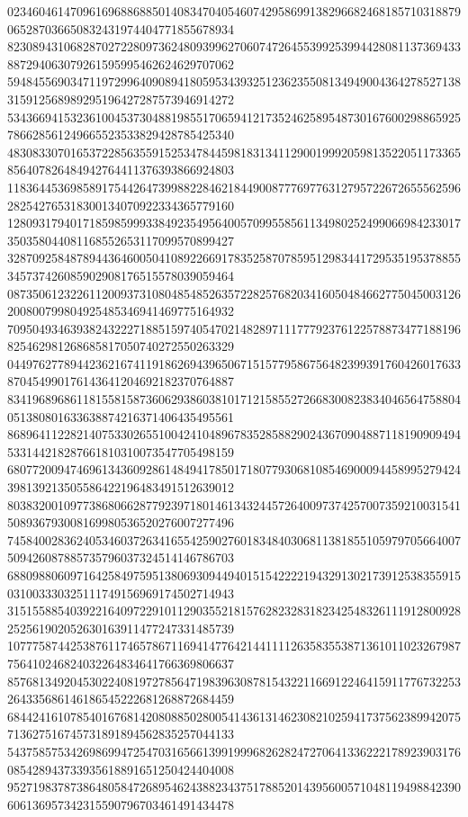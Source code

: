 \begin{DoxyCode}
      023460461470961696886885014083470405460742958699138296682468185710318879065287036650832431974404771855678934
      823089431068287027228097362480939962706074726455399253994428081137369433887294063079261595995462624629707062
      594845569034711972996409089418059534393251236235508134949004364278527138315912568989295196427287573946914272
      534366941532361004537304881985517065941217352462589548730167600298865925786628561249665523533829428785425340
      483083307016537228563559152534784459818313411290019992059813522051173365856407826484942764411376393866924803
      118364453698589175442647399882284621844900877769776312795722672655562596282542765318300134070922334365779160
      128093179401718598599933849235495640057099558561134980252499066984233017350358044081168552653117099570899427
      328709258487894436460050410892266917835258707859512983441729535195378855345737426085902908176515578039059464
      087350612322611200937310804854852635722825768203416050484662775045003126200800799804925485346941469775164932
      709504934639382432227188515974054702148289711177792376122578873477188196825462981268685817050740272550263329
      044976277894423621674119186269439650671515779586756482399391760426017633870454990176143641204692182370764887
      834196896861181558158736062938603810171215855272668300823834046564758804051380801633638874216371406435495561
      868964112282140753302655100424104896783528588290243670904887118190909494533144218287661810310073547705498159
      680772009474696134360928614849417850171807793068108546900094458995279424398139213505586422196483491512639012
      803832001097738680662877923971801461343244572640097374257007359210031541508936793008169980536520276007277496
      745840028362405346037263416554259027601834840306811381855105979705664007509426087885735796037324514146786703
      688098806097164258497595138069309449401515422221943291302173912538355915031003330325111749156969174502714943
      315155885403922164097229101129035521815762823283182342548326111912800928252561902052630163911477247331485739
      107775874425387611746578671169414776421441111263583553871361011023267987756410246824032264834641766369806637
      857681349204530224081972785647198396308781543221166912246415911776732253264335686146186545222681268872684459
      684424161078540167681420808850280054143613146230821025941737562389942075713627516745731891894562835257044133
      543758575342698699472547031656613991999682628247270641336222178923903176085428943733935618891651250424404008
      952719837873864805847268954624388234375178852014395600571048119498842390606136957342315590796703461491434478

\end{DoxyCode}
